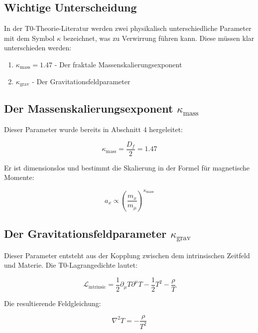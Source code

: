 	\subsection{Wichtige Unterscheidung}
	
	In der T0-Theorie-Literatur werden zwei physikalisch unterschiedliche Parameter mit dem Symbol $\kappa$ bezeichnet, was zu Verwirrung führen kann. Diese müssen klar unterschieden werden:
	
	\begin{enumerate}
		\item $\kappa_{\text{mass}} = 1.47$ - Der fraktale Massenskalierungsexponent
		\item $\kappa_{\text{grav}}$ - Der Gravitationsfeldparameter
	\end{enumerate}
	
	\subsection{Der Massenskalierungsexponent $\kappa_{\text{mass}}$}
	
	Dieser Parameter wurde bereits in Abschnitt 4 hergeleitet:
	
	\begin{equation}
		\kappa_{\text{mass}} = \frac{D_f}{2} = 1.47
	\end{equation}
	
	Er ist dimensionslos und bestimmt die Skalierung in der Formel für magnetische Momente:
	
	\begin{equation}
		a_x \propto \left(\frac{m_x}{m_\mu}\right)^{\kappa_{\text{mass}}}
	\end{equation}
	
	\subsection{Der Gravitationsfeldparameter $\kappa_{\text{grav}}$}
	
	Dieser Parameter entsteht aus der Kopplung zwischen dem intrinsischen Zeitfeld und Materie. Die T0-Lagrangedichte lautet:
	
	\begin{equation}
		\mathcal{L}_{\text{intrinsic}} = \frac{1}{2}\partial_\mu T \partial^\mu T - \frac{1}{2}T^2 - \frac{\rho}{T}
	\end{equation}
	
	Die resultierende Feldgleichung:
	
	\begin{equation}
		\nabla^2 T = -\frac{\rho}{T^2}
	\end{equation}
	
